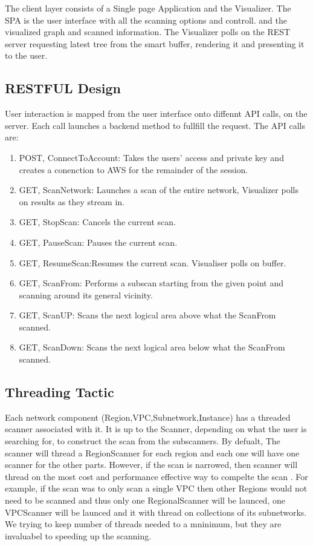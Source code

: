\documentclass[hidelinks,a4paper,12pt]{article}
\begin{document}
The client layer consists of a Single page Application and the Visualizer. The SPA is the user interface with all the scanning options and controll. and the visualized graph and scanned information. The Visualizer polls on the REST server requesting latest tree from the smart buffer, rendering it and presenting it to the user.

\subsection{RESTFUL Design}

User interaction is mapped from the user interface onto diffennt API calls, on the server. Each call launches a backend method to fullfill the request. The API calls are:
\begin{enumerate}  
	\item POST, ConnectToAccount: Takes the users' access and private key and creates a conenction to AWS for the remainder of the session.
	\item GET, ScanNetwork: Launches a scan of the entire network, Visualizer polls on results as they stream in. 
	\item GET, StopScan: Cancels the current scan.
	\item GET, PauseScan: Pauses the current scan.
	\item GET, ResumeScan:Resumes the current scan. Visualiser polls on buffer.
	\item GET, ScanFrom: Performs a subscan starting from the given point and scanning around its general vicinity.
	\item GET, ScanUP: Scans the next logical area above what the ScanFrom scanned.
	\item GET, ScanDown: Scans the next logical area below what the ScanFrom scanned.
\end{enumerate}

\subsection{Threading Tactic}
Each network component (Region,VPC,Subnetwork,Instance) has a threaded scanner associated with it. It is up to the Scanner, depending on what the user is searching for, to construct the scan from the subscanners.
By defualt, The scanner will thread a RegionScanner for each region and each one will have one scanner for the other parts. However, if the scan is narrowed, then scanner will thread on the most cost and performance effective way to compelte the scan . For example, if the scan was to only scan a single VPC then other Regions would not need to be scanned and thus only one RegionalScanner will be launced, one VPCScanner will be launced and it with thread on collections of its subnetworks. We trying to keep number of threads needed to a mninimum, but they are invaluabel to speeding up the scanning.  
\end{document}
